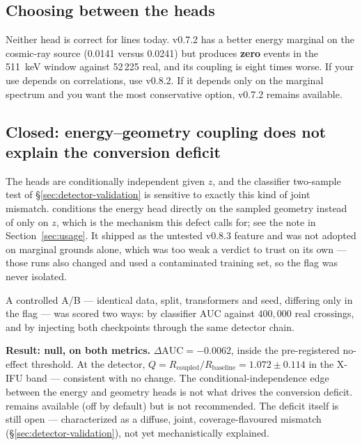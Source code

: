 \documentclass[11pt,a4paper]{article}
\begin{document}
\subsection{Choosing between the heads}

Neither head is correct for lines today. v0.7.2 has a better energy marginal on
the cosmic-ray source (0.0141 versus 0.0241) but produces \textbf{zero} events
in the 511~keV window against 52\,225 real, and its coupling is eight times
worse. If your use depends on correlations, use v0.8.2. If it depends only on
the marginal spectrum and you want the most conservative option, v0.7.2 remains
available.

\subsection{Closed: energy--geometry coupling does not explain the conversion deficit}
\label{sec:coupling-closed}

The heads are conditionally independent given $z$, and the classifier
two-sample test of \S\ref{sec:detector-validation} is sensitive to exactly this
kind of joint mismatch.  conditions the
energy head directly on the sampled geometry instead of only on $z$, which is
the mechanism this defect calls for; see the note in Section~\ref{sec:usage}.
It shipped as the untested v0.8.3 feature and was not adopted on marginal
grounds alone, which was too weak a verdict to trust on its own --- those runs
also changed  and used a contaminated training set, so the
flag was never isolated.

A controlled A/B --- identical data, split, transformers and seed, differing
only in the flag --- was scored two ways: by classifier AUC against $400{,}000$
real crossings, and by injecting both checkpoints through the same detector
chain.

\textbf{Result: null, on both metrics.} $\Delta\mathrm{AUC} = -0.0062$, inside
the pre-registered no-effect threshold. At the detector,
$Q = R_{\text{coupled}}/R_{\text{baseline}} = 1.072 \pm 0.114$ in the X-IFU
band --- consistent with no change. The conditional-independence edge between
the energy and geometry heads is not what drives the conversion deficit.
 remains available (off by default) but is
not recommended. The deficit itself is still open --- characterized as a
diffuse, joint, coverage-flavoured mismatch (\S\ref{sec:detector-validation}),
not yet mechanistically explained.
\end{document}

